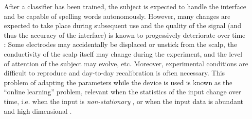 \documentclass[conference]{IEEEtran}
\begin{document}
After a classifier has been trained, the subject is expected to handle the interface and be capable
of spelling words autonomously.
However, many changes are expected to take place during subsequent use and
the quality of the signal (and 
thus the accuracy of the interface) is known to progessively deteriorate over time \cite{Shenoy2006}:
Some electrodes may accidentally be displaced or unstick from the scalp, the conductivity of the scalp itself 
may change during the experiment, 
and the level of attention of the subject may evolve, etc. Moreover, experimental 
conditions are difficult to reproduce
and day-to-day recalibration is often necessary.
This problem of adapting the parameters while the device is used 
is known as the ``online learning'' problem, relevant when the statistics of the input change over time, i.e. when 
the input is \emph{non-stationary} \cite{Kivinen08}, or
when the input data is abundant and high-dimensional \cite{Bottou03}.
\end{document}
